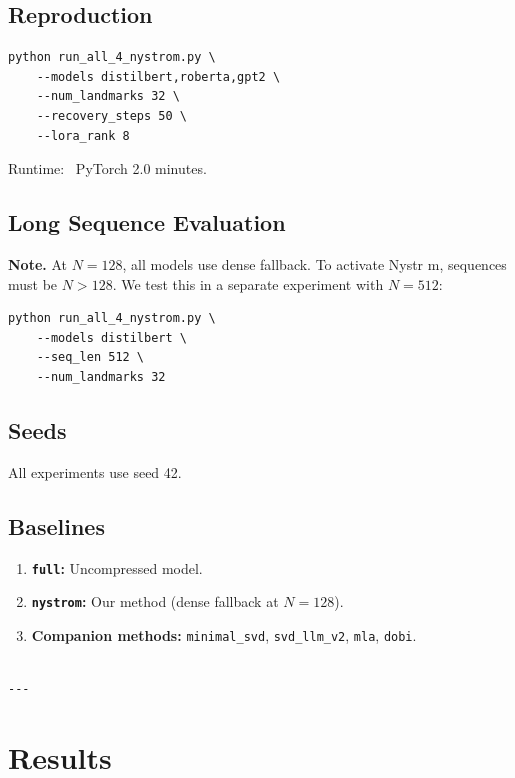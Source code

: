 \subsection{Reproduction}

\begin{lstlisting}
python run_all_4_nystrom.py \
    --models distilbert,roberta,gpt2 \
    --num_landmarks 32 \
    --recovery_steps 50 \
    --lora_rank 8
\end{lstlisting}

Runtime: ~PyTorch 2.0 minutes.

\subsection{Long Sequence Evaluation}

\textbf{Note.} At $N = 128$, all models use dense fallback. To activate Nystr m, 
sequences must be $N > 128$. We test this in a separate experiment with 
$N = 512$:

\begin{lstlisting}
python run_all_4_nystrom.py \
    --models distilbert \
    --seq_len 512 \
    --num_landmarks 32
\end{lstlisting}

\subsection{Seeds}

All experiments use seed 42.

\subsection{Baselines}

\begin{enumerate}
\item \textbf{\texttt{full}:} Uncompressed model.
\item \textbf{\texttt{nystrom}:} Our method (dense fallback at $N=128$).
\item \textbf{Companion methods:} \texttt{minimal\_svd}, \texttt{svd\_llm\_v2}, \texttt{mla}, \texttt{dobi}.
\end{enumerate}
\begin{lstlisting}

---
\end{lstlisting}


\section{Results}

